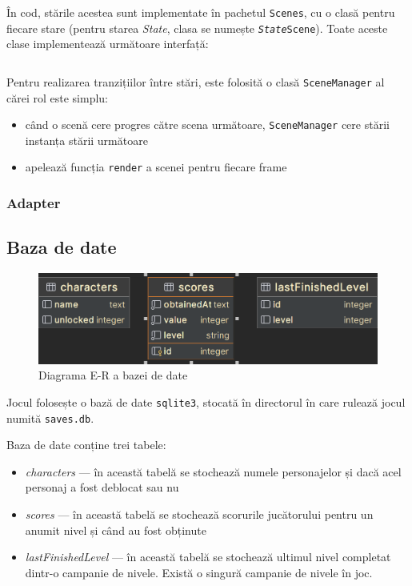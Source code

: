 \documentclass{article}
\begin{document}
    În cod, stările acestea sunt implementate în pachetul \texttt{Scenes}, cu o clasă pentru fiecare
    stare (pentru starea \emph{State}, clasa se numește \texttt{\emph{State}Scene}). Toate aceste
    clase implementează următoare interfață:

    \inputminted[linenos, breaklines]{java}{Scene.java}

    Pentru realizarea tranzițiilor între stări, este folosită o clasă \texttt{SceneManager} al cărei
    rol este simplu:
    \begin{itemize}
        \item când o scenă cere progres către scena următoare, \texttt{SceneManager} cere stării
        instanța stării următoare
        \item apelează funcția \texttt{render} a scenei pentru fiecare frame
    \end{itemize}

    \subsubsection{Adapter}

    \subsection{Baza de date}
    \begin{figure}[H]
        \includegraphics[width=\textwidth]{er-diagram}
        \centering
        \caption{Diagrama E-R a bazei de date}
    \end{figure}

    Jocul folosește o bază de date \texttt{sqlite3}, stocată în directorul în care rulează jocul
    numită \texttt{saves.db}.

    Baza de date conține trei tabele:
    \begin{itemize}
        \item \emph{characters} --- în această tabelă se stochează numele personajelor și dacă acel
        personaj a fost deblocat sau nu
        \item \emph{scores} --- în această tabelă se stochează scorurile jucătorului pentru un anumit
        nivel și când au fost obținute
        \item \emph{lastFinishedLevel} --- în această tabelă se stochează ultimul nivel completat
        dintr-o campanie de nivele. Există o singură campanie de nivele în joc.
    \end{itemize}
\end{document}
